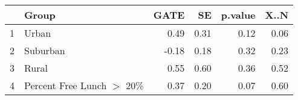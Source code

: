 \begin{tabular}{rlrrrr}
  \hline
 & Group & GATE & SE & p.value & X..N \\ 
  \hline
1 & Urban & 0.49 & 0.31 & 0.12 & 0.06 \\ 
  2 & Suburban & -0.18 & 0.18 & 0.32 & 0.23 \\ 
  3 & Rural & 0.55 & 0.60 & 0.36 & 0.52 \\ 
  4 & Percent Free Lunch $>$ 20\% & 0.37 & 0.20 & 0.07 & 0.60 \\ 
   \hline
\end{tabular}
